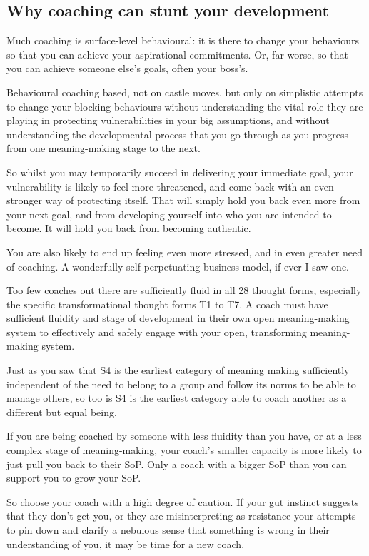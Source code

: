 \subsection{Why coaching can stunt your development}
Much coaching is surface-level behavioural: it is there to change your behaviours so that you can achieve your aspirational commitments. Or, far worse, so that you can achieve someone else's goals, often your boss’s. 


Behavioural coaching based, not on castle moves, but only on simplistic attempts to change your blocking behaviours without understanding the vital role they are playing in protecting vulnerabilities in your big assumptions, and without understanding the developmental process that you go through as you progress from one meaning\hyp{}making stage to the next.


So whilst you may temporarily succeed in delivering your immediate goal, your vulnerability is likely to feel more threatened, and come back with an even stronger way of protecting itself. That will simply hold you back even more from your next goal, and from developing yourself into who you are intended to become. It will hold you back from becoming authentic.


You are also likely to end up feeling even more stressed, and in even greater need of coaching. A wonderfully self-perpetuating business model, if ever I saw one. 


Too few coaches out there are sufficiently fluid in all 28 thought forms, especially the specific transformational thought forms T1 to T7. A coach must have sufficient fluidity and stage of development in their own open meaning\hyp{}making system to effectively and safely engage with your open, transforming meaning\hyp{}making system.


Just as you saw that S4 is the earliest category of meaning making sufficiently independent of the need to belong to a group and follow its norms to be able to manage others, so too is S4 is the earliest category able to coach another as a different but equal being.


If you are being coached by someone with less fluidity than you have, or at a less complex stage of meaning\hyp{}making, your coach's smaller capacity is more likely to just pull you back to their SoP. Only a coach with a bigger SoP than you can support you to grow your SoP.


So choose your coach with a high degree of caution. If your gut instinct suggests that they don't get you, or they are misinterpreting as resistance your attempts to pin down and clarify a nebulous sense that something is wrong in their understanding of you, it may be time for a new coach. 


